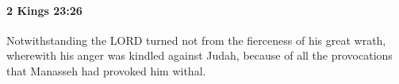 
		\paragraph{2 Kings 23:26} %
			\label{2KINGS-23-26}

			Notwithstanding the LORD turned not from the fierceness of his great wrath, wherewith his anger was kindled against Judah, because of all the provocations that Manasseh had provoked him withal.


